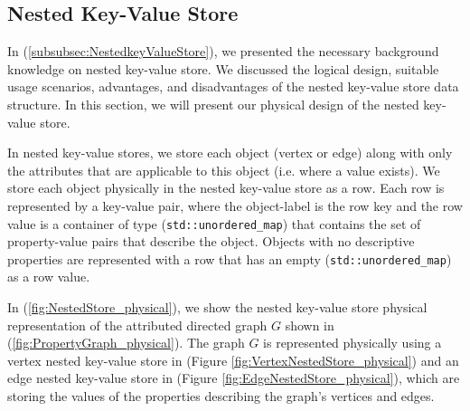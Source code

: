 {\subsection{Nested Key-Value Store}
\label{subsec:PhyDesign-NestedStore}

In (\ref{subsubsec:NestedkeyValueStore}), we presented the necessary background knowledge on nested key-value store. We discussed the logical design, suitable usage scenarios, advantages, and disadvantages of the nested key-value store data structure. In this section, we will present our physical design of the nested key-value store.

In nested key-value stores, we store each object (vertex or edge) along with only the attributes that are applicable to this object (i.e. where a value exists). We store each object physically in the nested key-value store as a row. Each row is represented by a key-value pair, where the object-label is the row key and the row value is a container of type (\texttt{std::unordered\_map}) that contains the set of property-value pairs that describe the object. Objects with no descriptive properties are represented with a row that has an empty (\texttt{std::unordered\_map}) as a row value.

In (\ref{fig:NestedStore_physical}), we show the nested key-value store physical representation of the attributed directed graph $G$ shown in (\ref{fig:PropertyGraph_physical}). The graph $G$ is represented physically using a vertex nested key-value store in (Figure \ref{fig:VertexNestedStore_physical}) and an edge nested key-value store in (Figure \ref{fig:EdgeNestedStore_physical}), which are storing the values of the properties describing the graph's vertices and edges.

}
